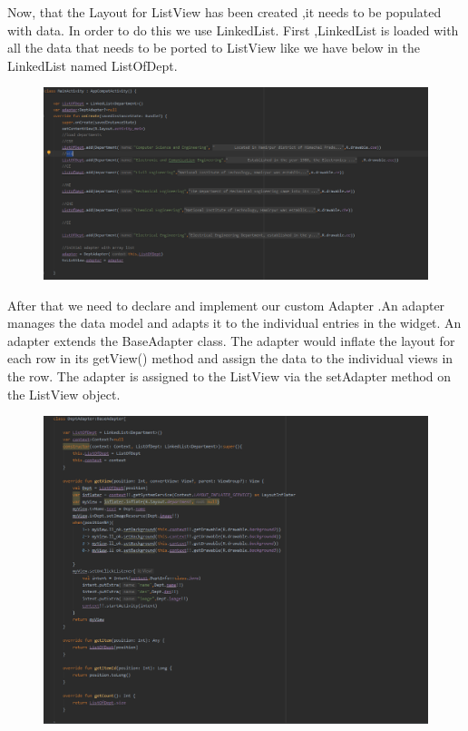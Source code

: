 \documentclass[11pt,a4paper]{report}
\begin{document}
Now, that the Layout for ListView has been created ,it needs to be populated with data.
In order to do this we use LinkedList.
First ,LinkedList is loaded with all the data that needs to be ported to ListView like we have
below in the LinkedList named ListOfDept.

\vspace{15pt}

\begin{figure}[H]
	\centering
		\includegraphics[scale=0.5]{./img/load_linked.PNG}
  \end{figure}

  \vspace{5pt}


After that we need to declare and implement our custom Adapter .An adapter manages the data model and adapts it to the individual entries in the widget. An adapter extends the BaseAdapter class.
The adapter would inflate the layout for each row in its getView() method and assign the data to the individual views in the row.
The adapter is assigned to the ListView via the setAdapter method on the ListView object.


\vspace{15pt}

\begin{figure}[H]
	\centering
		\includegraphics[scale=0.5]{./img/adapter.PNG}
  \end{figure}
\end{document}
